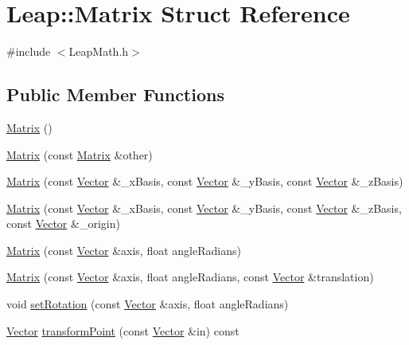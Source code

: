 \hypertarget{struct_leap_1_1_matrix}{\section{Leap\+:\+:Matrix Struct Reference}
\label{struct_leap_1_1_matrix}
}


{\ttfamily \#include $<$Leap\+Math.\+h$>$}

\subsection*{Public Member Functions}
\begin{DoxyCompactItemize}
\item 
\hyperlink{struct_leap_1_1_matrix_a4d6481d902815a4cb8d3982fed44499c}{Matrix} ()
\item 
\hyperlink{struct_leap_1_1_matrix_a21ac99c16f55dbbb9295254fd4deb0ea}{Matrix} (const \hyperlink{struct_leap_1_1_matrix}{Matrix} \&other)
\item 
\hyperlink{struct_leap_1_1_matrix_a64f54ffc81b0ab492edb8a4c19dc6675}{Matrix} (const \hyperlink{struct_leap_1_1_vector}{Vector} \&\+\_\+x\+Basis, const \hyperlink{struct_leap_1_1_vector}{Vector} \&\+\_\+y\+Basis, const \hyperlink{struct_leap_1_1_vector}{Vector} \&\+\_\+z\+Basis)
\item 
\hyperlink{struct_leap_1_1_matrix_a54c6172ddcd4f52de044faedad060e04}{Matrix} (const \hyperlink{struct_leap_1_1_vector}{Vector} \&\+\_\+x\+Basis, const \hyperlink{struct_leap_1_1_vector}{Vector} \&\+\_\+y\+Basis, const \hyperlink{struct_leap_1_1_vector}{Vector} \&\+\_\+z\+Basis, const \hyperlink{struct_leap_1_1_vector}{Vector} \&\+\_\+origin)
\item 
\hyperlink{struct_leap_1_1_matrix_afbd0364e85e050f935432b27cfb7c8cc}{Matrix} (const \hyperlink{struct_leap_1_1_vector}{Vector} \&axis, float angle\+Radians)
\item 
\hyperlink{struct_leap_1_1_matrix_ac0004234bfba1a275a062725b8c56572}{Matrix} (const \hyperlink{struct_leap_1_1_vector}{Vector} \&axis, float angle\+Radians, const \hyperlink{struct_leap_1_1_vector}{Vector} \&translation)
\item 
void \hyperlink{struct_leap_1_1_matrix_ac48ea6588487ef4be20a31a663f58be6}{set\+Rotation} (const \hyperlink{struct_leap_1_1_vector}{Vector} \&axis, float angle\+Radians)
\item 
\hyperlink{struct_leap_1_1_vector}{Vector} \hyperlink{struct_leap_1_1_matrix_afabbef88d8949e98a86e97bab3451325}{transform\+Point} (const \hyperlink{struct_leap_1_1_vector}{Vector} \&in) const 

\end{DoxyCompactItemize}
